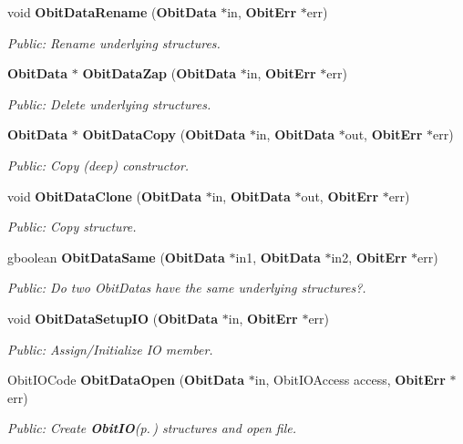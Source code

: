 \begin{CompactItemize}
void {\bf Obit\-Data\-Rename} ({\bf Obit\-Data} $\ast$in, {\bf Obit\-Err} $\ast$err)
\begin{CompactList}\small\item\em Public: Rename underlying structures. \item\end{CompactList}\item 
{\bf Obit\-Data} $\ast$ {\bf Obit\-Data\-Zap} ({\bf Obit\-Data} $\ast$in, {\bf Obit\-Err} $\ast$err)
\begin{CompactList}\small\item\em Public: Delete underlying structures. \item\end{CompactList}\item 
{\bf Obit\-Data} $\ast$ {\bf Obit\-Data\-Copy} ({\bf Obit\-Data} $\ast$in, {\bf Obit\-Data} $\ast$out, {\bf Obit\-Err} $\ast$err)
\begin{CompactList}\small\item\em Public: Copy (deep) constructor. \item\end{CompactList}\item 
void {\bf Obit\-Data\-Clone} ({\bf Obit\-Data} $\ast$in, {\bf Obit\-Data} $\ast$out, {\bf Obit\-Err} $\ast$err)
\begin{CompactList}\small\item\em Public: Copy structure. \item\end{CompactList}\item 
gboolean {\bf Obit\-Data\-Same} ({\bf Obit\-Data} $\ast$in1, {\bf Obit\-Data} $\ast$in2, {\bf Obit\-Err} $\ast$err)
\begin{CompactList}\small\item\em Public: Do two Obit\-Datas have the same underlying structures?. \item\end{CompactList}\item 
void {\bf Obit\-Data\-Setup\-IO} ({\bf Obit\-Data} $\ast$in, {\bf Obit\-Err} $\ast$err)
\begin{CompactList}\small\item\em Public: Assign/Initialize IO member. \item\end{CompactList}\item 
Obit\-IOCode {\bf Obit\-Data\-Open} ({\bf Obit\-Data} $\ast$in, Obit\-IOAccess access, {\bf Obit\-Err} $\ast$err)
\begin{CompactList}\small\item\em Public: Create {\bf Obit\-IO}{\rm (p.\,\pageref{structObitIO})} structures and open file. \item\end{CompactList}\item 

\end{CompactItemize}
